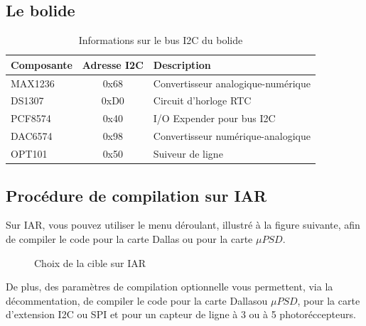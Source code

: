 \documentclass[10pt,a4paper,final]{article}
\begin{document}
\begin{spacing}{1.5}
\subsection{Le bolide}
\begin{table}[!ht]
\centering
\begin{tabular}{|l|c|l|}
\hline 
\textbf{Composante} & \textbf{Adresse I{\small 2}C} & \textbf{Description} \\ 
\hline 
MAX1236 & 0x68 & Convertisseur analogique-numérique \\ 
\hline 
DS1307  & 0xD0 & Circuit d'horloge RTC \\ 
\hline 
PCF8574 & 0x40 & I/O Expender pour bus I{\small 2}C \\ 
\hline 
DAC6574 & 0x98  & Convertisseur numérique-analogique  \\ 
\hline 
OPT101  &  0x50 & Suiveur de ligne  \\ 
\hline 
\end{tabular} 
\caption{Informations sur le bus I{\small 2}C du bolide}
\label{tab:testtab1}
\end{table}

\pagebreak
\subsection{Procédure de compilation sur IAR}
Sur IAR, vous pouvez utiliser le menu déroulant, illustré à la figure suivante, afin de compiler le code pour la carte Dallas ou pour la carte $\mu PSD$. 

\begin{figure}[hbtp]
\caption{Choix de la cible sur IAR}
\centering
{}
\end{figure}

De plus, des paramètres de compilation optionnelle vous permettent, via la décommentation, de compiler le code pour la carte Dallasou $\mu PSD$, pour la carte d'extension I2C ou SPI et pour un capteur de ligne à 3 ou à 5 photoréccepteurs.\\
\end{spacing}
\end{document}
